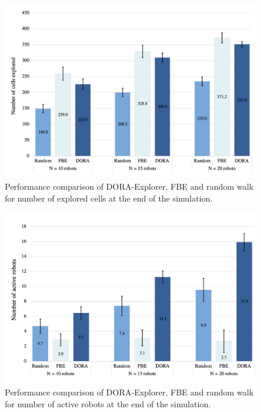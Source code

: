 \begin{figure}[]
    \centering
    \includegraphics[width=1\columnwidth]{images/cell_explored.png}
    \caption{Performance comparison of DORA-Explorer, FBE and random walk for number of explored cells at the end of the simulation.}
    \label{results:exploration}
\end{figure}

\begin{figure}[]
    \centering
    \includegraphics[width=1\columnwidth]{images/active_robot.png}
    \caption{Performance comparison of DORA-Explorer, FBE and random walk for number of active robots at the end of the simulation.}
    \label{results:active}
\end{figure}


